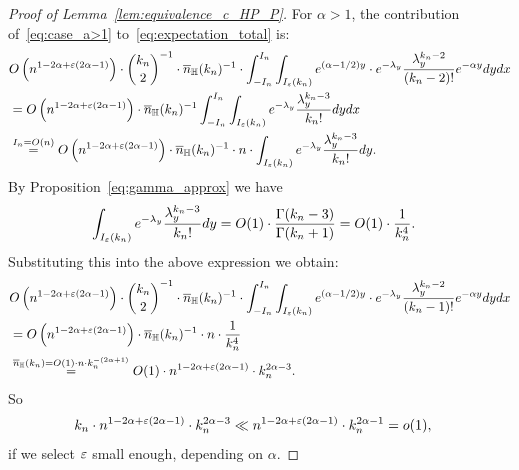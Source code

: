 \begin{proof}[Proof of Lemma~\ref{lem:equivalence_c_HP_P}]
For $\alpha > 1$, the contribution of~\eqref{eq:case_a>1} to~\eqref{eq:expectation_total} is:
\begin{equation*} 
\begin{split}
& O\left( n^{1-2\alpha + \varepsilon (2\alpha -1)} \right) \cdot {k_n \choose 2}^{-1} \cdot \overline{n}_{\mathbb{H}}(k_n)^{-1} \cdot 
\int_{-I_n}^{I_n} \int_{I_\varepsilon (k_n)} 
e^{(\alpha -1/2) y} \cdot e^{-\lambda_y} 
\frac{\lambda_y^{k_n-2}}{(k_n-2)!} e^{-\alpha y} dy dx \\ 
&= O\left( n^{1-2\alpha + \varepsilon(2\alpha -1)} \right) \cdot \overline{n}_{\mathbb{H}}(k_n)^{-1}
\int_{-I_n}^{I_n} \int_{I_\varepsilon (k_n)} 
e^{-\lambda_y} 
\frac{\lambda_y^{k_n - 3}}{k_n!}  dy dx \\ 
&\stackrel{I_n = O(n)}{=}  O\left( n^{1-2\alpha + \varepsilon(2\alpha -1)} \right) 
\cdot \overline{n}_{\mathbb{H}}(k_n)^{-1} \cdot  n \cdot 
\int_{I_\varepsilon (k_n)} e^{-\lambda_y} 
\frac{\lambda_y^{k_n -3}}{k_n!} dy. 
\end{split}
\end{equation*}
By Proposition~\ref{eq:gamma_approx} we have
\begin{equation*} 
\begin{split} 
&\int_{I_\varepsilon (k_n)} e^{-\lambda_y} \frac{\lambda_y^{k_n-3}}{k_n!}  dy= 
O(1) \cdot \frac{\Gamma(k_n-3)}{\Gamma (k_n+1)} = O(1) \cdot 
\frac{1}{k_n^4}.
\end{split}
\end{equation*}
Substituting this into the above expression we obtain: 
\begin{equation*}
\begin{split}
&O\left( n^{1-2\alpha + \varepsilon(2\alpha -1)} \right) \cdot {k_n \choose 2}^{-1} \cdot \overline{n}_{\mathbb{H}}(k_n)^{-1} \cdot
\int_{-I_n}^{I_n} \int_{I_\varepsilon (k_n)} e^{(\alpha -1/2)y }\cdot
e^{-\lambda_y} 
\frac{\lambda_y^{k_n-2}}{(k_n-1)!} e^{-\alpha y} dy dx \\ 
&=O\left( n^{1-2\alpha + \varepsilon(2\alpha -1)} \right) \cdot  \overline{n}_{\mathbb{H}}(k_n)^{-1} \cdot n \cdot  
\frac{1}{k_n^4} \\
&\stackrel{\overline{n}_{\mathbb{H}}(k_n) = O(1) \cdot n \cdot k_n^{-(2\alpha +1)}}{=}O(1)\cdot  
n^{1-2\alpha + \varepsilon(2\alpha -1)} \cdot k_n^{2\alpha -3} .
\end{split}
\end{equation*}
So
\begin{equation*}
\begin{split}
&k_n \cdot n^{1-2\alpha + \varepsilon(2\alpha -1)} \cdot k_n^{2\alpha -3} 
\ll n^{1 - 2\alpha + \varepsilon(2\alpha -1)}  \cdot k_n^{2\alpha - 1}  = o(1),
\end{split}
\end{equation*}
if we select $\varepsilon$ small enough, depending on $\alpha$. 


\end{proof}
